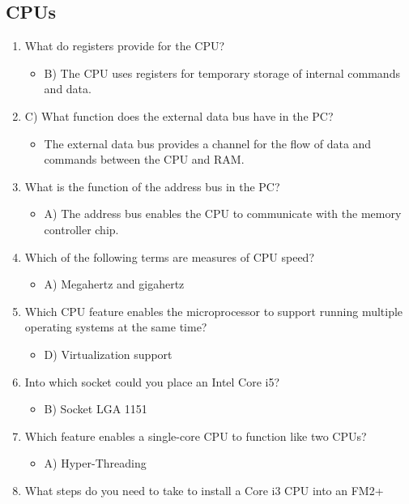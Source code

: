 \documentclass{article}
\begin{document}
\subsection{CPUs}
\begin{enumerate}
     \item What do registers provide for the CPU?
    \begin{itemize}
        \item B) The CPU uses registers for temporary storage of internal
commands and data.
    \end{itemize}
    \item C) What function does the external data bus have in the PC?
    \begin{itemize}
        \item The external data bus provides a channel for the flow of data and
commands between the CPU and RAM.
    \end{itemize}
    \item What is the function of the address bus in the PC?
    \begin{itemize}
        \item A) The address bus enables the CPU to communicate with the
memory controller chip.
    \end{itemize}
    \item Which of the following terms are measures of CPU speed?
    \begin{itemize}
        \item A) Megahertz and gigahertz
    \end{itemize}
    \item Which CPU feature enables the microprocessor to support running
multiple operating systems at the same time?
    \begin{itemize}
        \item D) Virtualization support
    \end{itemize}
    \item Into which socket could you place an Intel Core i5?
    \begin{itemize}
        \item B) Socket LGA 1151
    \end{itemize}
    \item Which feature enables a single-core CPU to function like two CPUs?
    \begin{itemize}
        \item A) Hyper-Threading
    \end{itemize}
    \item What steps do you need to take to install a Core i3 CPU into an FM2+

\end{enumerate}
\end{document}
